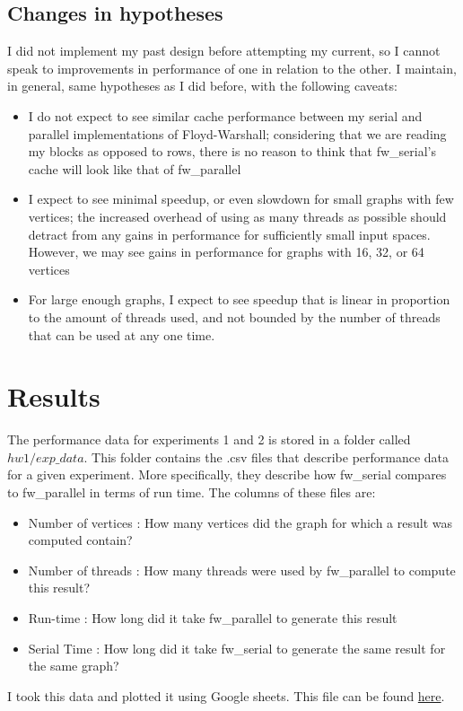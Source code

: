 \documentclass[]{article}
\begin{document}
	\subsection{Changes in hypotheses}
	I did not implement my past design before attempting my current, so I cannot speak to improvements in performance of one in relation to the other. I maintain, in general, same hypotheses as I did before, with the following caveats:
	\begin{itemize}
		\item I do not expect to see similar cache performance between my serial and parallel implementations of Floyd-Warshall; considering that we are reading my blocks as opposed to rows, there is no reason to think that fw\_serial's cache will look like that of fw\_parallel
		\item I expect to see minimal speedup, or even slowdown for small graphs with few vertices; the increased overhead of using as many threads as possible should detract from any gains in performance for sufficiently small input spaces. However, we may see gains in performance for graphs with 16, 32, or 64 vertices
		\item For large enough graphs, I expect to see speedup that is linear in proportion to the amount of threads used, and not bounded by the number of threads that can be used at any one time.
	\end{itemize}
\section{Results}
	The performance data for experiments 1 and 2 is stored in a folder called $hw1/exp\_data$. This folder contains the .csv files that describe performance data for a given experiment. More specifically, they describe how fw\_serial compares to fw\_parallel in terms of run time. The columns of these files are:
	\begin{itemize}
		\item Number of vertices : How many vertices did the graph for which a result was computed contain?
		\item Number of threads : How many threads were used by fw\_parallel to compute this result?
		\item Run-time : How long did it take fw\_parallel to generate this result
		\item Serial Time : How long did it take fw\_serial to generate the same result for the same graph?
	\end{itemize}
	I took this data and plotted it using Google sheets. This file can be found \href{https://docs.google.com/spreadsheets/d/1XrjW1c_qoefwkYxm_nAwCrnQ4Z4TFlYyeFtUYgdvXZE/edit?usp=sharing}{here}.
\end{document}
